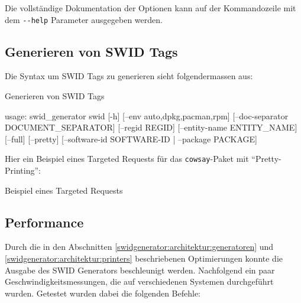 Die vollständige Dokumentation der Optionen kann auf der Kommandozeile mit dem
\texttt{-{}-help} Parameter ausgegeben werden.


\subsection{Generieren von SWID Tags}

Die Syntax um SWID Tags zu generieren sieht folgendermassen aus:

\begin{listing}[H]
\caption{Generieren von SWID Tags}
\begin{textcode}
usage: swid_generator swid [-h] [--env {auto,dpkg,pacman,rpm}]
                           [--doc-separator DOCUMENT_SEPARATOR]
                           [--regid REGID] [--entity-name ENTITY_NAME]
                           [--full] [--pretty]
                           [--software-id SOFTWARE-ID | --package PACKAGE]
\end{textcode}
\end{listing}

Hier ein Beispiel eines Targeted Requests für das \texttt{cowsay}-Paket mit
\enquote{Pretty-Printing}:

\begin{listing}[H]
\caption{Beispiel eines Targeted Requests}
\end{listing}


\subsection{Performance}

Durch die in den Abschnitten \ref{swidgenerator:architektur:generatoren} und
\ref{swidgenerator:architektur:printers} beschriebenen Optimierungen konnte die
Ausgabe des SWID Generators beschleunigt werden. Nachfolgend ein paar
Geschwindigkeitsmessungen, die auf verschiedenen Systemen durchgeführt wurden.
Getestet wurden dabei die folgenden Befehle:

